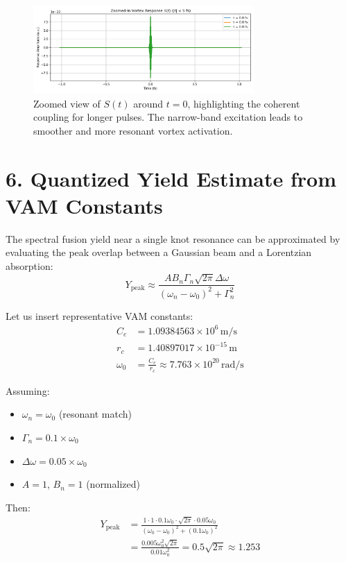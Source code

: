 \begin{figure}[h!]
  \centering
  \includegraphics[width=0.75\textwidth]{Appendix_BeamSwirlInteractionSpectrumImage4}
  \caption{Zoomed view of $S(t)$ around $t = 0$, highlighting the coherent coupling for longer pulses. The narrow-band excitation leads to smoother and more resonant vortex activation.}
\end{figure}


\section*{6. Quantized Yield Estimate from VAM Constants}

The spectral fusion yield near a single knot resonance can be approximated by evaluating the peak overlap between a Gaussian beam and a Lorentzian absorption:
\begin{equation}
Y_{\text{peak}} \approx \frac{A B_n \Gamma_n \sqrt{2\pi} \Delta \omega}{(\omega_n - \omega_0)^2 + \Gamma_n^2}
\end{equation}

Let us insert representative VAM constants:
\begin{align*}
C_e &= 1.09384563 \times 10^6 \, \text{m/s} \\
r_c &= 1.40897017 \times 10^{-15} \, \text{m} \\
\omega_0 &= \frac{C_e}{r_c} \approx 7.763 \times 10^{20} \, \text{rad/s}
\end{align*}

Assuming:
\begin{itemize}
  \item $\omega_n = \omega_0$ (resonant match)
  \item $\Gamma_n = 0.1 \times \omega_0$
  \item $\Delta \omega = 0.05 \times \omega_0$
  \item $A = 1$, $B_n = 1$ (normalized)
\end{itemize}

Then:
\begin{align*}
Y_{\text{peak}} &= \frac{1 \cdot 1 \cdot 0.1 \omega_0 \cdot \sqrt{2\pi} \cdot 0.05 \omega_0}{(\omega_0 - \omega_0)^2 + (0.1 \omega_0)^2} \\
&= \frac{0.005 \omega_0^2 \sqrt{2\pi}}{0.01 \omega_0^2} = 0.5 \sqrt{2\pi} \approx 1.253
\end{align*}

